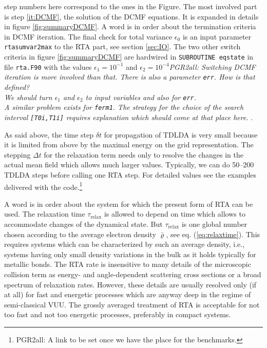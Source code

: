 \documentclass[final,1p]{elsarticle}
\newcommand{\PGRcomm}[1]{{\color{blue}\small\em PGR2all: #1}}
\newcommand{\PGRfoot}[1]{{\color{blue}\footnote{\color{blue} #1}}}
\begin{document}
step numbers here correspond to the ones in the Figure. The most
involved part is step \ref{it:DCMF}, the solution of the DCMF
equations.  It is expanded in details in figure \ref{fig:summaryDCMF}.
A word is in order about the termination criteria in DCMF iteration.
The final check for total variance $\epsilon_0$ is an input parameter
{\tt rtasumvar2max} to the RTA part, see section \ref{sec:IO}.  The
two other switch criteria in figure \ref{fig:summaryDCMF} are
hardwired in {\tt SUBROUTINE eqstate} in file {\tt rta.F90} with the
values $\epsilon_1=10^{-1}$ and $\epsilon_2=10^{-4}$\PGRcomm{Switching
DCMF iteration is more involved than that. There is also a parameter
{\tt err}. How is that defined?
\\
We should turn $\epsilon_1$ and  $\epsilon_2$ to input variables and
also for {\tt err}.
\\
A similar problem exists for {\tt ferm1}. The strategy for the 
choice of the search interval {\tt [T0i,T1i]} requires explanation
which should come at that place here. 
}.


As said above, the time step $\delta t$ for propagation of TDLDA is
very small because it is limited from above by the maximal energy on
the grid representation.  The stepping $\Delta t$ for the relaxation
term needs only to resolve the changes in the actual mean field which
allows much larger values.  Typically, we can do 50--200 TDLDA steps
before calling one RTA step. For detailed values see the examples
delivered with the code.\PGRfoot{PGR2all: A link to be set once we
have the place for the benchmarks.}


A word is in order about the system for which the present form of RTA
can be used.  The relaxation time $\tau_\mathrm{relax}$ is allowed to
depend on time which allows to accommodate changes of the dynamical
state. But $\tau_\mathrm{relax}$ is one global number chosen according
to the average electron density $\bar{\varrho}$, see
eq. (\ref{eq:relaxtime}).  This requires systems which can be
characterized by such an average density, i.e., systems having only
small density variations in the bulk as it holds typically for
metallic bonds.  The RTA rate is insensitive to many details of the
microscopic collision term as energy- and angle-dependent scattering
cross sections \cite{Gig03a} or a broad spectrum of relaxation
rates. However, these details are usually resolved only (if at all)
for fast and energetic processes which are anyway deep in the regime
of semi-classical VUU. The grossly averaged treatment of RTA is
acceptable for not too fast and not too energetic processes,
preferably in compact systems.
\end{document}

